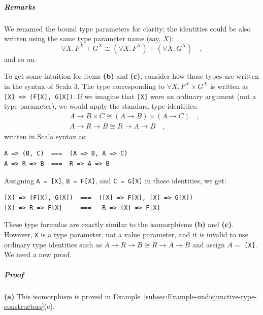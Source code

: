 \subparagraph{Remarks}

We renamed the bound type parameters for clarity; the identities could
be also written using the same type parameter name (say, $X$):
\[
\forall X.\,F^{X}+G^{X}\cong(\forall X.\,F^{X})+(\forall X.\,G^{X})\quad,
\]
and so on.

To get some intuition for items \textbf{(b)} and \textbf{(c)}, consider
how those types are written in the syntax of Scala 3. The type corresponding
to $\forall X.\,F^{X}\times G^{X}$ is written as \lstinline![X] => (F[X], G[X])!.
If we imagine that \lstinline![X]! were an ordinary argument (not
a type parameter), we would apply the standard type identities:
\begin{align*}
 & A\rightarrow B\times C\cong(A\rightarrow B)\times(A\rightarrow C)\quad,\\
 & A\rightarrow R\rightarrow B\cong R\rightarrow A\rightarrow B\quad,
\end{align*}
written in Scala syntax as:
\begin{lstlisting}
A => (B, C)  ===  (A => B, A => C)
A => R => B  ===  R => A => B
\end{lstlisting}
Assigning \lstinline!A = [X]!, \lstinline!B = F[X]!, and \lstinline!C = G[X]!
in those identities, we get:
\begin{lstlisting}
[X] => (F[X], G[X])  ===  ([X] => F[X], [X] => G[X])
[X] => R => F[X]     ===   R => [X] => F[X]
\end{lstlisting}
These type formulas are exactly similar to the isomorphisms \textbf{(b)}
and \textbf{(c)}. However, \lstinline!X! is a type parameter, not
a value parameter, and it is invalid to use ordinary type identities
such as $A\rightarrow R\rightarrow B\cong R\rightarrow A\rightarrow B$
and assign $A=$ \lstinline![X]!. We need a new proof. 

\subparagraph{Proof}

\textbf{(a)} This isomorphism is proved in Example~\ref{subsec:Example-undisjunctive-type-constructors}(e). 

